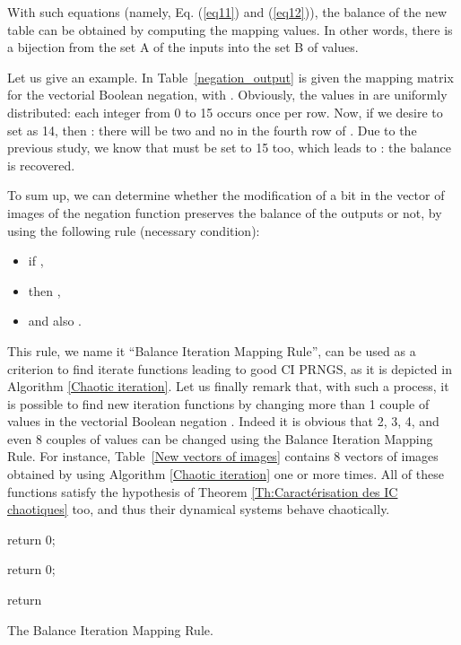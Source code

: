 \documentclass[conference]{IEEEtran}
\begin{document}
With such equations (namely, Eq. (\ref{eq11}) and (\ref{eq12})), the balance of the new table can be obtained by computing the mapping values. In other words, there is a bijection from the set A of the inputs  into the set B of  values.

Let us give an example. In Table~\ref{negation_output} is given the mapping matrix for the vectorial Boolean negation, with . Obviously, the values in  are uniformly distributed: each integer from 0 to 15 occurs once per row. 
Now, if we desire to set  as 14, then : there will be two  and no  in the fourth row of . Due to the previous study, we know that  must be set to 15 too, which leads to : the balance is recovered.

To sum up, we can determine whether the modification of a bit in the vector of images of the negation function preserves the balance of the outputs or not, by using the following rule (necessary condition):
\begin{itemize}
\item if ,
\item then ,
\item and also .
\end{itemize}

This rule, we name it ``Balance Iteration Mapping Rule'', can be used as a criterion to find iterate functions leading to good CI PRNGS, as it is depicted in Algorithm \ref{Chaotic iteration}.
Let us finally remark that, with such a process, it is possible to find new iteration functions by changing more than 1 couple of values in the vectorial Boolean negation . Indeed it is obvious that 2, 3, 4, and even 8 couples of values can be changed using the Balance Iteration Mapping Rule.
For instance, Table~\ref{New vectors of images} contains 8 vectors of images obtained by using Algorithm \ref{Chaotic iteration} one or more times. All of these functions satisfy the hypothesis of Theorem \ref{Th:Caractérisation   des   IC   chaotiques} too, and thus their dynamical systems behave chaotically.






\begin{algorithm}
\SetAlgoLined
{}
\For{}
{
\For{}
{

\If{}
{

\If{}
{
return 0;
}

}

}

\If{}
{
return 0;
}

}
return \;
\caption{The Balance Iteration Mapping Rule.}
\label{Chaotic iteration}
\end{algorithm}
\end{document}
